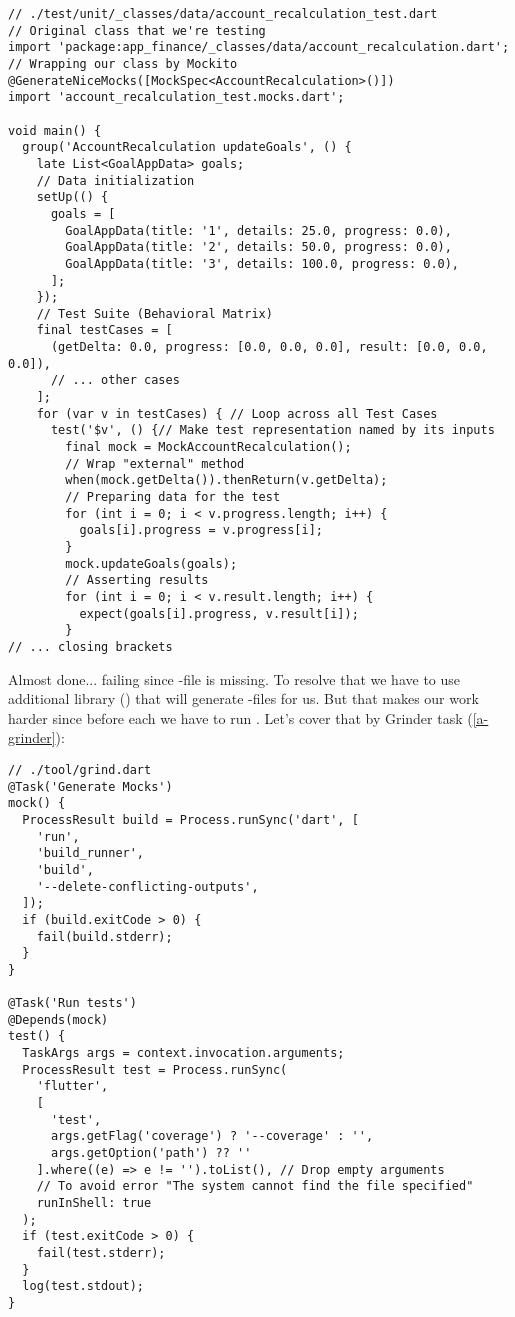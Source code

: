 \begin{lstlisting}
// ./test/unit/_classes/data/account_recalculation_test.dart
// Original class that we're testing
import 'package:app_finance/_classes/data/account_recalculation.dart';
// Wrapping our class by Mockito
@GenerateNiceMocks([MockSpec<AccountRecalculation>()])
import 'account_recalculation_test.mocks.dart';

void main() {
  group('AccountRecalculation updateGoals', () {
    late List<GoalAppData> goals;
    // Data initialization
    setUp(() {
      goals = [
        GoalAppData(title: '1', details: 25.0, progress: 0.0),
        GoalAppData(title: '2', details: 50.0, progress: 0.0),
        GoalAppData(title: '3', details: 100.0, progress: 0.0),
      ];
    });
    // Test Suite (Behavioral Matrix)
    final testCases = [
      (getDelta: 0.0, progress: [0.0, 0.0, 0.0], result: [0.0, 0.0, 0.0]),
      // ... other cases
    ];
    for (var v in testCases) { // Loop across all Test Cases
      test('$v', () {// Make test representation named by its inputs
        final mock = MockAccountRecalculation();
        // Wrap "external" method
        when(mock.getDelta()).thenReturn(v.getDelta);
        // Preparing data for the test
        for (int i = 0; i < v.progress.length; i++) {
          goals[i].progress = v.progress[i];
        }
        mock.updateGoals(goals);
        // Asserting results
        for (int i = 0; i < v.result.length; i++) {
          expect(goals[i].progress, v.result[i]);
        }
// ... closing brackets
\end{lstlisting}

\noindent Almost done... failing since -file is missing. To resolve that we 
have to use additional library  () that will generate 
-files for us. But that makes our work harder since before each  we have to run 
. Let's cover that by Grinder task (\ref{a-grinder}):

\begin{lstlisting}
// ./tool/grind.dart
@Task('Generate Mocks')
mock() {
  ProcessResult build = Process.runSync('dart', [
    'run',
    'build_runner',
    'build',
    '--delete-conflicting-outputs',
  ]);
  if (build.exitCode > 0) {
    fail(build.stderr);
  }
}

@Task('Run tests')
@Depends(mock)
test() {
  TaskArgs args = context.invocation.arguments;
  ProcessResult test = Process.runSync(
    'flutter', 
    [
      'test',
      args.getFlag('coverage') ? '--coverage' : '',
      args.getOption('path') ?? ''
    ].where((e) => e != '').toList(), // Drop empty arguments
    // To avoid error "The system cannot find the file specified"
    runInShell: true
  );
  if (test.exitCode > 0) {
    fail(test.stderr);
  }
  log(test.stdout);
}
\end{lstlisting}


